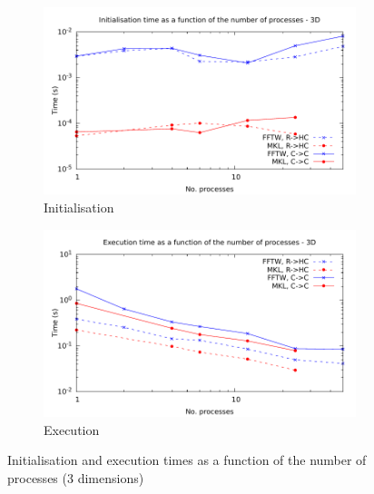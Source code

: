 \documentclass[12pt, a4paper]{article} \setlength{\textheight}{24cm}
\begin{document}
\begin{figure}[H]
  \centering
  \begin{subfigure}{.5\textwidth}
    \centering
    \includegraphics[width=.9\linewidth]{graphs/mpi-init-3d.pdf}
    \caption{Initialisation}
    \label{3DMPII}
  \end{subfigure}%
  \begin{subfigure}{.5\textwidth}
    \centering
    \includegraphics[width=.9\linewidth]{graphs/mpi-exec-3d.pdf}
    \caption{Execution}
    \label{3DMPIE}
  \end{subfigure}
  \caption{Initialisation and execution times as a function of the
    number of processes (3 dimensions)}
  \label{3DMPI}
\end{figure}
\end{document}
